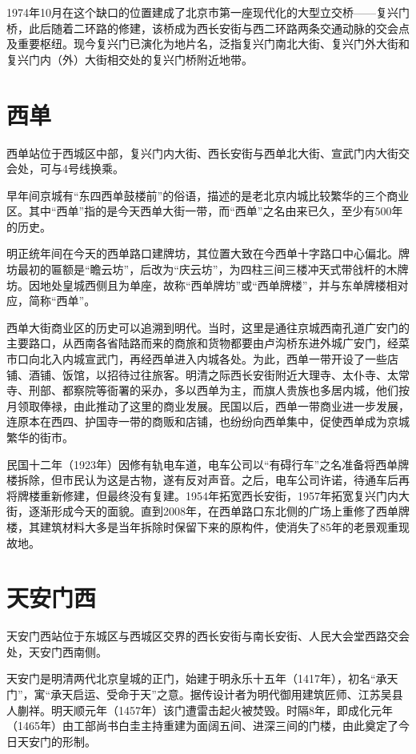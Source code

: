1974年10月在这个缺口的位置建成了北京市第一座现代化的大型立交桥——复兴门桥，此后随着二环路的修建，该桥成为西长安街与西二环路两条交通动脉的交会点及重要枢纽。现今复兴门已演化为地片名，泛指复兴门南北大街、复兴门外大街和复兴门内（外）大街相交处的复兴门桥附近地带。

\section{西单}
西单站位于西城区中部，复兴门内大街、西长安街与西单北大街、宣武门内大街交会处，可与4号线换乘。

早年间京城有“东四西单鼓楼前”的俗语，描述的是老北京内城比较繁华的三个商业区。其中“西单”指的是今天西单大街一带，而“西单”之名由来已久，至少有500年的历史。

明正统年间在今天的西单路口建牌坊，其位置大致在今西单十字路口中心偏北。牌坊最初的匾额是“瞻云坊”，后改为“庆云坊”，为四柱三间三楼冲天式带戗杆的木牌坊。因地处皇城西侧且为单座，故称“西单牌坊”或“西单牌楼”，并与东单牌楼相对应，简称“西单”。

西单大街商业区的历史可以追溯到明代。当时，这里是通往京城西南孔道广安门的主要路口，从西南各省陆路而来的商旅和货物都要由卢沟桥东进外城广安门，经菜市口向北入内城宣武门，再经西单进入内城各处。为此，西单一带开设了一些店铺、酒铺、饭馆，以招待过往旅客。明清之际西长安街附近大理寺、太仆寺、太常寺、刑部、都察院等衙署的采办，多以西单为主，而旗人贵族也多居内城，他们按月领取俸禄，由此推动了这里的商业发展。民国以后，西单一带商业进一步发展，连原本在西四、护国寺一带的商贩和店铺，也纷纷向西单集中，促使西单成为京城繁华的街市。

民国十二年（1923年）因修有轨电车道，电车公司以“有碍行车”之名准备将西单牌楼拆除，但市民认为这是古物，遂有反对声音。之后，电车公司许诺，待通车后再将牌楼重新修建，但最终没有复建。1954年拓宽西长安街，1957年拓宽复兴门内大街，逐渐形成今天的面貌。直到2008年，在西单路口东北侧的广场上重修了西单牌楼，其建筑材料大多是当年拆除时保留下来的原构件，使消失了85年的老景观重现故地。

\section{天安门西}
天安门西站位于东城区与西城区交界的西长安街与南长安街、人民大会堂西路交会处，天安门西南侧。

天安门是明清两代北京皇城的正门，始建于明永乐十五年（1417年），初名“承天门”，寓“承天启运、受命于天”之意。据传设计者为明代御用建筑匠师、江苏吴县人蒯祥。明天顺元年（1457年）该门遭雷击起火被焚毁。时隔8年，即成化元年（1465年）由工部尚书白圭主持重建为面阔五间、进深三间的门楼，由此奠定了今日天安门的形制。

